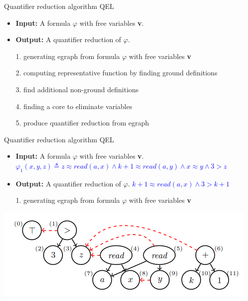 \documentclass{beamer}
\begin{document}
\begin{frame}{Quantifier reduction algorithm QEL}
\begin{itemize}
    \item \textbf{Input:} A formula $\varphi$ with free variables \textbf{v}.
    \item \textbf{Output:} A quantifier reduction of $\varphi$.
    \pause
    \item[1.] generating egraph from formula $\varphi$ with free variables
    \textbf{v}
    \pause
    \item[2.] computing representative function by finding ground definitions
    \pause
    \item[3.] find additional non-ground definitions
    \pause
    \item[4.] finding a core to eliminate variables
    \pause
    \item[5.] produce quantifier reduction from egraph
\end{itemize}
\end{frame}

\begin{frame}{Quantifier reduction algorithm QEL}

\begin{center}
\begin{itemize}
    \item \textbf{Input:} A formula $\varphi$ with free variables \textbf{v}. 
    \textcolor{blue}{$\varphi_1 (x,y,z) \triangleq z \approx read(a,x) \land k + 1 \approx read(a,y) \land x \approx y \land 3 > z$}
    \item \textbf{Output:} A quantifier reduction of $\varphi$.
    \textcolor{blue}{$k+1 \approx read(a,x) \land 3 > k+1$}
    \item[1.] generating egraph from formula $\varphi$ with free variables
    \textbf{v}
\end{itemize}
\end{center}
\begin{center}
\includegraphics[scale=0.4]{FMI1.png}
\end{center}

\end{frame}
\end{document}
